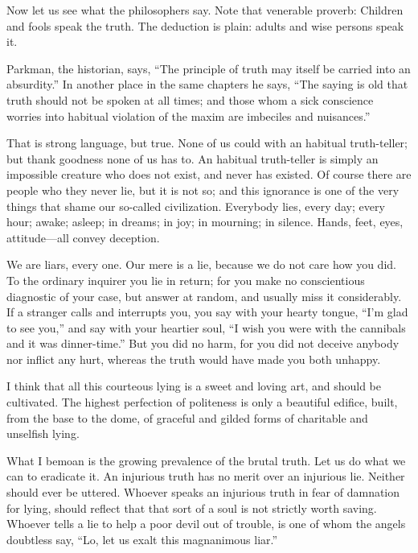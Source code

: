 Now let us see what the philosophers say. Note that venerable proverb:
Children and fools  speak the truth. The deduction is plain:
adults and wise persons  speak it.

Parkman, the historian, says,
``The principle of truth may itself be carried into an absurdity.'' In
another place in the same chapters he says, ``The saying is old that
truth should not be spoken at all times; and those whom a sick
conscience worries into habitual violation of the maxim are imbeciles
and nuisances.''

That  is strong language, but true.
None of us could  with an habitual truth-teller;
but thank goodness none of us has to. An habitual truth-teller is simply
an impossible creature who does not exist, and never has existed.
Of course there are people who  they
never lie, but it is not so; and this ignorance is one of the very
things that shame our so-called civilization. Everybody lies, every day;
every hour; awake; asleep; in dreams; in joy; in mourning; in silence.
Hands, feet, eyes, attitude---all convey deception.

We are liars, every one. Our mere 
is a lie, because we do not care how you did.
To the ordinary inquirer you lie in return; for you make
no conscientious diagnostic of your case, but answer at random, and
usually miss it considerably. If a stranger calls and interrupts
you, you say with your hearty tongue, ``I'm glad to see you,'' and say
with your heartier soul, ``I wish you were with the cannibals and it was
dinner-time.'' But you did no harm, for you did not
deceive anybody nor inflict any hurt, whereas the truth would have made
you both unhappy.

I think that all this courteous lying is a sweet and loving art, and
should be cultivated. The highest perfection of politeness is only a
beautiful edifice, built, from the base to the dome, of graceful and
gilded forms of charitable and unselfish lying.

What I bemoan is the growing prevalence of the brutal truth. Let us do
what we can to eradicate it. An injurious truth has no merit over an
injurious lie. Neither should ever be uttered. Whoever speaks an
injurious truth in fear of damnation for lying, should
reflect that that sort of a soul is not strictly worth saving.
Whoever tells a lie to help a poor devil out of trouble, is one of whom the
angels doubtless say, ``Lo, let us exalt this magnanimous liar.''

